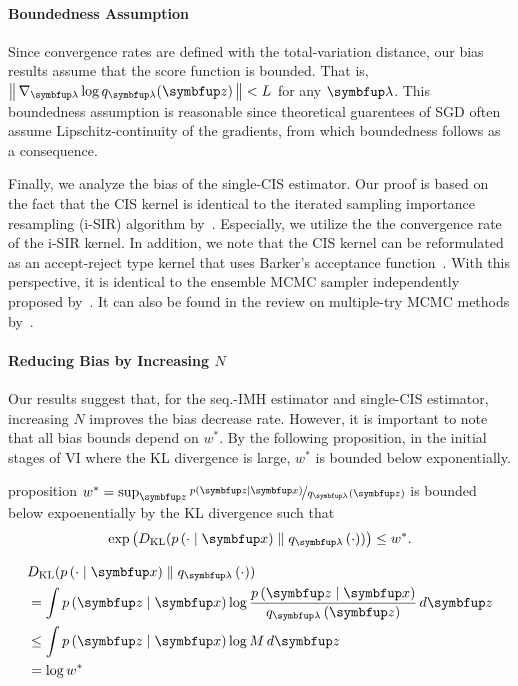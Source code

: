 \paragraph{Boundedness Assumption}
Since convergence rates are defined with the total-variation distance, our bias results assume that the score function is bounded.
That is, \(\norm{\nabla_{\vlambda} \log q_{\vlambda}(\vz)} < L\) for any \(\vlambda\).
This boundedness assumption is reasonable since theoretical guarentees of SGD often assume Lipschitz-continuity of the gradients, from which boundedness follows as a consequence.

%

%

%
Finally, we analyze the bias of the single-CIS estimator.
Our proof is based on the fact that the CIS kernel is identical to the iterated sampling importance resampling (i-SIR) algorithm by~\citet{andrieu_uniform_2018}.
Especially, we utilize the the convergence rate of the i-SIR kernel.
In addition, we note that the CIS kernel can be reformulated as an accept-reject type kernel that uses Barker's acceptance function~\citep{barker_monte_1965}.
With this perspective, it is identical to the ensemble MCMC sampler independently proposed by~\citet{austad_parallel_2007, neal_mcmc_2011a}.
It can also be found in the review on multiple-try MCMC methods by~\citet[Table 12]{martino_review_2018a}.
%

%
\paragraph{Reducing Bias by Increasing \(N\)}
Our results suggest that, for the seq.-IMH estimator and single-CIS estimator, increasing \(N\) improves the bias decrease rate.
However, it is important to note that all bias bounds depend on \(w^*\).
By the following proposition, in the initial stages of VI where the KL divergence is large, \(w^*\) is bounded below exponentially.

\begin{theoremEnd}{proposition}
  \(w^* = \sup_{\vz} \nicefrac{p\left(\vz\mid\vx\right)}{q_{\vlambda}\left(\vz\right)} \) is bounded below expoenentially by the KL divergence such that
  \[
  \exp\left(\DKL{p\left(\cdot\mid\vx\right)}{ q_{\vlambda}\left(\cdot\right) }\right) \leq w^*.
  \]
\end{theoremEnd}
\begin{proofEnd}
  \begin{align}
    &\DKL{p\left(\cdot\mid\vx\right)}{ q_{\vlambda}\left(\cdot\right) } \\
    &= \int p\left(\vz\mid\vx\right) \log \frac{p\left(\vz\mid\vx\right)}{q_{\vlambda}\left(\vz\right)}\,d\vz \\
    &\leq \int p\left(\vz\mid\vx\right) \log M \, d\vz \\
    &= \log w^*
  \end{align}
\end{proofEnd}

